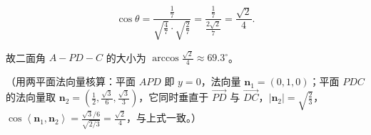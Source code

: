 \begin{answer}
\nopagebreak[4]
\[\cos\theta=\frac{\frac17}{\sqrt{\frac47}\cdot\sqrt{\frac27}}=\frac{\frac17}{\frac{2\sqrt2}{7}}=\frac{\sqrt2}{4}.\]

故二面角 $A-PD-C$ 的大小为 $\arccos\frac{\sqrt2}{4}\approx69.3^\circ$。

（用两平面法向量核算：平面 $APD$ 即 $y=0$，法向量 $\boldsymbol n_1=(0,1,0)$；平面 $PDC$ 的法向量取 $\boldsymbol n_2=\left(\frac12,\frac{\sqrt3}6,\frac{\sqrt3}3\right)$，它同时垂直于 $\overrightarrow{PD}$ 与 $\overrightarrow{DC}$，$\left|\boldsymbol n_2\right|=\sqrt{\frac23}$，$\cos\left\langle\boldsymbol n_1,\boldsymbol n_2\right\rangle=\frac{\sqrt3/6}{\sqrt{2/3}}=\frac{\sqrt2}4$，与上式一致。）


\end{answer}
